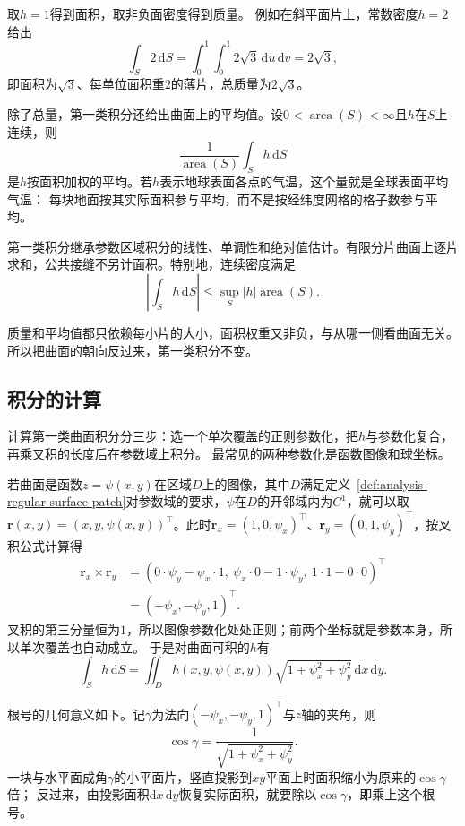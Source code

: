 取$h=1$得到面积，取非负面密度得到质量。
例如在斜平面片上，常数密度$h=2$给出
\[
 \int_S2\,\mathrm dS=\int_0^1\int_0^1 2\sqrt3\,\mathrm du\,\mathrm dv=2\sqrt3,
\]
即面积为$\sqrt3$、每单位面积重$2$的薄片，总质量为$2\sqrt3$。

除了总量，第一类积分还给出曲面上的平均值。设$0<\operatorname{area}(S)<\infty$且$h$在$S$上连续，则
\[
 \frac1{\operatorname{area}(S)}\int_Sh\,\mathrm dS
\]
是$h$按面积加权的平均。若$h$表示地球表面各点的气温，这个量就是全球表面平均气温：
每块地面按其实际面积参与平均，而不是按经纬度网格的格子数参与平均。

第一类积分继承参数区域积分的线性、单调性和绝对值估计。有限分片曲面上逐片求和，公共接缝不另计面积。特别地，连续密度满足
\[
 \left|\int_S h\,\mathrm dS\right|\leq\sup_S|h|\operatorname{area}(S).
\]

质量和平均值都只依赖每小片的大小，面积权重又非负，与从哪一侧看曲面无关。所以把曲面的朝向反过来，第一类积分不变。

\subsection{积分的计算}

计算第一类曲面积分分三步：选一个单次覆盖的正则参数化，把$h$与参数化复合，再乘叉积的长度后在参数域上积分。
最常见的两种参数化是函数图像和球坐标。

若曲面是函数$z=\psi(x,y)$在区域$D$上的图像，其中$D$满足定义~\ref{def:analysis-regular-surface-patch}对参数域的要求，$\psi$在$D$的开邻域内为$C^1$，就可以取
$\bm r(x,y)=(x,y,\psi(x,y))^\top$。此时$\bm r_x=(1,0,\psi_x)^\top$、$\bm r_y=(0,1,\psi_y)^\top$，按叉积公式计算得
\[
 \begin{aligned}
 \bm r_x\times\bm r_y
 &=(0\cdot\psi_y-\psi_x\cdot1,\ \psi_x\cdot0-1\cdot\psi_y,\ 1\cdot1-0\cdot0)^\top\\
 &=(-\psi_x,-\psi_y,1)^\top.
 \end{aligned}
\]
叉积的第三分量恒为$1$，所以图像参数化处处正则；前两个坐标就是参数本身，所以单次覆盖也自动成立。
于是对曲面可积的$h$有
\begin{equation}
 \int_Sh\,\mathrm dS
 =\iint_Dh(x,y,\psi(x,y))\sqrt{1+\psi_x^2+\psi_y^2}\,\mathrm dx\,\mathrm dy.
 \label{eq:analysis-graph-surface-area-element}
\end{equation}

根号的几何意义如下。记$\gamma$为法向$(-\psi_x,-\psi_y,1)^\top$与$z$轴的夹角，则
\[
 \cos\gamma=\frac1{\sqrt{1+\psi_x^2+\psi_y^2}}.
\]
一块与水平面成角$\gamma$的小平面片，竖直投影到$xy$平面上时面积缩小为原来的$\cos\gamma$倍；
反过来，由投影面积$\mathrm dx\,\mathrm dy$恢复实际面积，就要除以$\cos\gamma$，即乘上这个根号。

